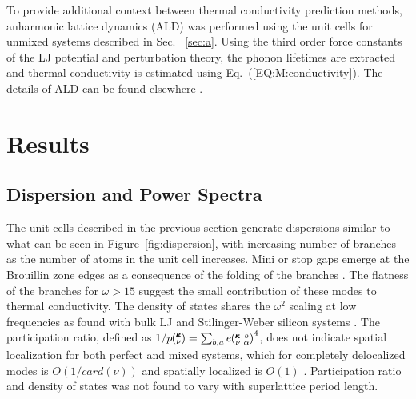 \documentclass[aps,prb,preprint,preprintnumbers,amsmath,amssymb,floatfix,superscriptaddress]{revtex4}
\newcommand{\kvba}{\mspace{-4.0mu}\left(\mspace{-8.0mu}
\begin{smallmatrix} &\pmb{\kappa} &b \\ &\nu &\alpha\end{smallmatrix}
\mspace{-3.0mu}\right)}
\newcommand{\kv}{\mspace{-4.0mu}\left(\mspace{-8.0mu}
\begin{smallmatrix}&\pmb{\kappa} \\&\nu\end{smallmatrix}
\mspace{-3.0mu}\right)}
\begin{document}
To provide additional context between thermal conductivity prediction methods, anharmonic lattice dynamics (ALD) was performed using the unit cells for unmixed systems described in Sec. ~\ref{sec:a}. Using the third order force constants of the LJ potential and perturbation theory, the phonon lifetimes are extracted and thermal conductivity is estimated using Eq.~(\ref{EQ:M:conductivity}). The details of ALD can be found elsewhere \cite{PhysRevB.79.064301}.

\section{Results}
\subsection{Dispersion and Power Spectra}

The unit cells described in the previous section generate dispersions similar to what can be seen in Figure~\ref{fig:dispersion}, with increasing number of branches as the number of atoms in the unit cell increases. Mini or stop gaps emerge at the Brouillin zone edges as a consequence of the folding of the branches \cite{PhysRevB.38.1427,PhysRevB.60.2627}. The flatness of the branches for $\omega > 15$ suggest the small contribution of these modes to thermal conductivity. The density of states shares the $\omega^2$ scaling at low frequencies as found with bulk LJ and Stilinger-Weber silicon systems \cite{}. The participation ratio, defined as $1/p\kv=\sum_{b,a}e\kvba^4$, does not indicate spatial localization for both perfect and mixed systems, which for completely delocalized modes is $O(1/card(\nu))$ and spatially localized is $O(1)$ \cite{PhysRevB.70.235214}. Participation ratio and density of states was not found to vary with superlattice period length.
\renewcommand{\topfraction}{0.7}
\begin{figure*}[ht!]
\begin{center}
\renewcommand{\figure}{Fig.}
\caption{Dispersion for modes normal to the interfaces, density of states and inverse participation ratio of a 4x4 superlattice. Red squares represent select modes for $\pmb{\kappa}=[1,0,0]$.}
\label{fig:dispersion}
\end{center}
\end{figure*}
\end{document}
